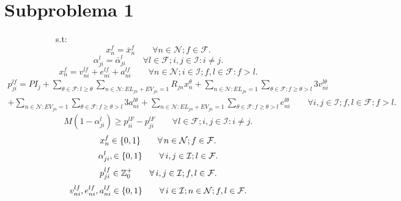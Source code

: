 \documentclass[authoryear,preprint,review,12pts]{elsarticle}
\begin{document}
\section{Subproblema 1}
~~~~~~~~~~~~s.t:
\begin{equation}\label{x_sp1}
x_n^f= \bar{x}_n^f \qquad \forall n \in \mathcal{N}; f \in \mathcal{F}.
\end{equation}
\begin{equation}\label{alpha-sp1}
\alpha_{ji}^l = \bar{\alpha}_{ji}^l \qquad \forall l \in \mathcal{F}; i,j \in \mathcal{I}: i \neq j.
\end{equation}
\begin{equation}\label{ecua7}
 x_n^f = v_{ni}^{lf} + e_{ni}^{lf} + a_{ni}^{lf} \qquad \forall n \in \mathcal{N}; i \in \mathcal{I}; f,l \in \mathcal{F}: f > l.
\end{equation}
\begin{multline}\label{ecua9}
  p_{ji}^{lf} = PI_j + \sum_{\theta \in  \mathcal{F}: l \geq \theta}\sum\limits_{n \in \mathcal{N}: EL_{jn}+EV_{jn}=1}R_{jn}x_n^\theta + \sum\limits_{n \in \mathcal{N}: EL_{jn}=1}\sum\limits_{\theta \in \mathcal{F}: f \geq \theta > l}3v_{ni}^{l\theta} \\
  + \sum\limits_{n \in \mathcal{N}: EV_{jn}=1}\sum\limits_{\theta \in \mathcal{F}: f \geq \theta > l}3a_{ni}^{l\theta} + \sum\limits_{n \in \mathcal{N}: EL_{jn}+ EV_{jn}=1}\sum\limits_{\theta \in \mathcal{F}: f \geq \theta > l}e_{ni}^{l\theta} \qquad \forall i,j \in \mathcal{I}; f,l \in \mathcal{F}: f > l.
\end{multline}
\begin{equation}\label{ecua11}
   M(1 - \alpha_{ji}^l) \geq p_{ii}^{lF} - p_{ji}^{lF} \qquad \forall l \in \mathcal{F}; i,j \in \mathcal{I}: i \neq j.
\end{equation}
\begin{equation}\label{ecua29_sp1}
  x_n^f \in\{0,1\} \qquad \forall\, n \in \mathcal{N}; f \in \mathcal{F}.\\
\end{equation}
\begin{equation}\label{ecua33_sp1}
  \alpha_{ji}^l, \in \{0,1\} \qquad \forall\, i,j \in \mathcal{I}; l \in \mathcal{F}.\\
\end{equation}
\begin{equation}\label{ecua31}
  p_{ji}^{lf} \in \mathbb{Z}^+_0 \qquad \forall\, i,j \in \mathcal{I}; f,l \in \mathcal{F}.\\
\end{equation}
\begin{equation}\label{ecua32}
  v_{ni}^{lf}, e_{ni}^{lf}, a_{ni}^{lf} \in \{0,1\} \qquad \forall\, i \in \mathcal{I}; n \in \mathcal{N}; f,l \in \mathcal{F}.\\
\end{equation}
\end{document}
